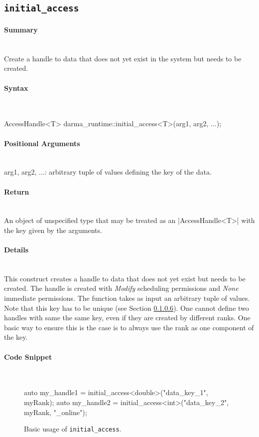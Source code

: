 \subsection{\texttt{initial\_access}}

\paragraph{Summary}\mbox{}\\ 
Create a handle to data that does not yet exist in the system 
but needs to be created.

\paragraph{Syntax}\mbox{}\\ 
\begin{CppCode}
AccessHandle<T> darma_runtime::initial_access<T>(arg1, arg2, ...);
\end{CppCode}

\paragraph{Positional Arguments}\mbox{}\\ 
arg1, arg2, ...: arbitrary tuple of values defining the key of the data.

\paragraph{Return}\mbox{}\\ 
An object of unspecified type that may be treated as an |AccessHandle<T>|
with the key given by the arguments.

\paragraph{Details}\mbox{}\\ 
This construct creates a handle to data that does not yet 
exist but needs to be created.  The handle is created with {\it Modify}
scheduling permissions and {\it None} immediate permissions.  The function takes
as input an arbitrary tuple of values.
Note that this key has to be unique (see Section \ref{}).
One cannot define two handles with same the same key, even if they are created by different ranks.
One basic way to ensure this is the case is to always use the rank 
as one component of the key. 

\paragraph{Code Snippet}\mbox{}\\
\begin{figure}[!h]
\begin{CppCodeNumb}
  auto my_handle1 = initial_access<double>("data_key_1", myRank);
  auto my_handle2 = initial_access<int>("data_key_2", myRank, "_online");
\end{CppCodeNumb}
\label{fig:fe_api_initialaccess}
\caption{Basic usage of \lstinline|initial_access|.}
\end{figure}

